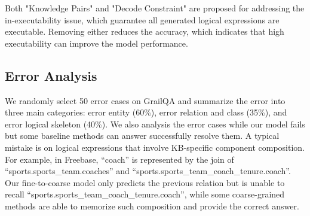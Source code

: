 Both "Knowledge Pairs" and "Decode Constraint" are proposed for addressing the in-executability issue, which guarantee all generated logical expressions are executable. Removing either reduces the accuracy, which indicates that high executability can improve the model performance.

\subsection{Error Analysis}
We randomly select 50 error cases on GrailQA and summarize the error into three main categories: error entity (60\%), error relation and class (35\%), and error logical skeleton (40\%). We also analysis the error cases while our model fails but some baseline methods can answer successfully resolve them. A typical mistake is on logical expressions that involve KB-specific component composition. For example, in Freebase, ``coach'' is represented by the join of ``sports.sports\_team.coaches'' and ``sports.sports\_team\_coach\_tenure.coach''. Our fine-to-coarse model only predicts the  previous relation but is unable to recall ``sports.sports\_team\_coach\_tenure.coach'', while some coarse-grained methods are able to memorize such composition and provide the correct answer.
